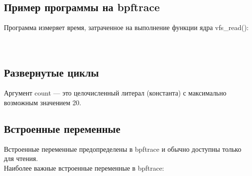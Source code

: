 \subsection{Пример программы на bpftrace}

Программа измеряет время, затраченное на выполнение функции ядра vfs\_read(): \\

 \\
\cn{\{ }
\cn{\}} \\
\cn{\{ }
\cn{\} }

\subsection{Развернутые циклы}
Аргумент count — это целочисленный литерал (константа) с максимально возможным значением 20. \\


\subsection{Встроенные переменные}
Встроенные переменные предопределены в bpftrace и обычно доступны только для
чтения. \\
Наиболее важные встроенные переменные в bpftrace:


